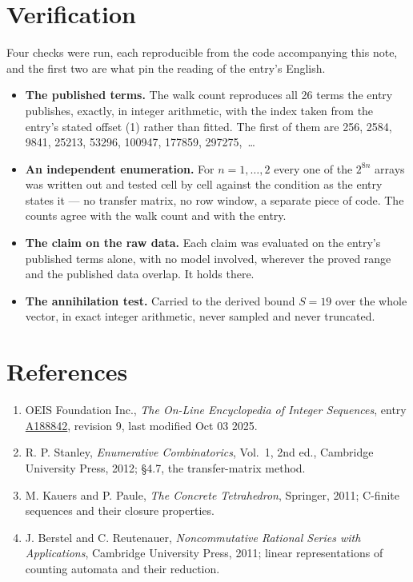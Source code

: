 \documentclass[11pt]{article}
\theoremstyle{definition}
\begin{document}
\section{Verification}

Four checks were run, each reproducible from the code accompanying this note, and the first two are what pin the reading of the entry's English.

\begin{itemize}

\item {\bfseries The published terms.} The walk count reproduces all 26 terms the entry publishes, exactly, in integer arithmetic, with the index taken from the entry's stated offset (1) rather than fitted. The first of them are 256, 2584, 9841, 25213, 53296, 100947, 177859, 297275,~\dots

\item {\bfseries An independent enumeration.} For $n = 1,\dots,2$ every one of the $2^{8n}$ arrays was written out and tested cell by cell against the condition as the entry states it --- no transfer matrix, no row window, a separate piece of code. The counts agree with the walk count and with the entry.

\item {\bfseries The claim on the raw data.} Each claim was evaluated on the entry's published terms alone, with no model involved, wherever the proved range and the published data overlap. It holds there.

\item {\bfseries The annihilation test.} Carried to the derived bound $S = 19$ over the whole vector, in exact integer arithmetic, never sampled and never truncated.

\end{itemize}

\section{References}

\begin{enumerate}

\item OEIS Foundation Inc., \emph{The On-Line Encyclopedia of Integer Sequences}, entry \href{https://oeis.org/A188842}{A188842}, revision 9, last modified Oct 03 2025.

\item R. P. Stanley, \emph{Enumerative Combinatorics}, Vol.~1, 2nd ed., Cambridge University Press, 2012; \S4.7, the transfer-matrix method.

\item M. Kauers and P. Paule, \emph{The Concrete Tetrahedron}, Springer, 2011; C-finite sequences and their closure properties.

\item J. Berstel and C. Reutenauer, \emph{Noncommutative Rational Series with Applications}, Cambridge University Press, 2011; linear representations of counting automata and their reduction.

\end{enumerate}
\end{document}
